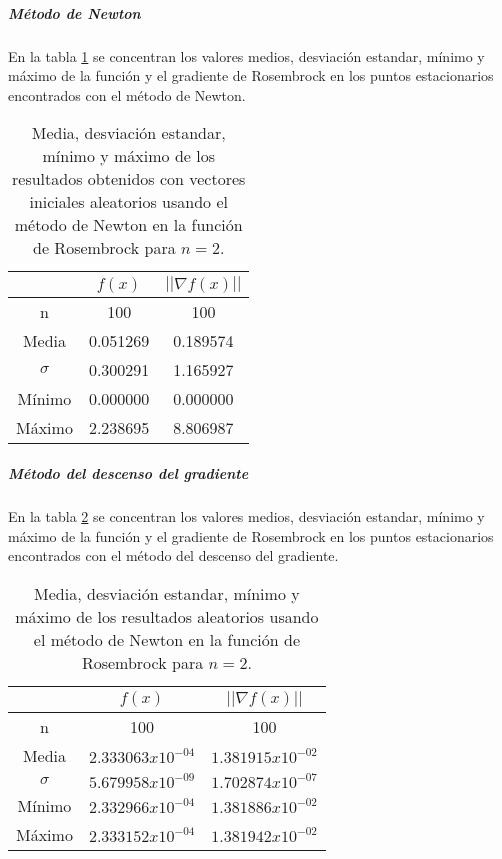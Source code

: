 \subparagraph{Método de Newton}

En la tabla \ref{table:rosembrock_2_random_newton} se concentran los valores medios, desviación estandar, mínimo y máximo de la función y el gradiente de Rosembrock en los puntos estacionarios encontrados con el método de Newton.

\begin{table}[H]
    \centering
    \begin{tabular}{ccc} \hline
                 & $f(x)$   & $||\nabla f(x)||$ \\ \hline
        n        & 100      & 100               \\
        Media    & 0.051269 & 0.189574          \\
        $\sigma$ & 0.300291 & 1.165927          \\
        Mínimo   & 0.000000 & 0.000000          \\
        Máximo   & 2.238695 & 8.806987          \\ \hline
    \end{tabular}
    \caption{Media, desviación estandar, mínimo y máximo de los resultados obtenidos con vectores iniciales aleatorios usando el método de Newton en la función de Rosembrock para $n=2$.}
    \label{table:rosembrock_2_random_newton}
\end{table}

\subparagraph{Método del descenso del gradiente}

En la tabla \ref{table:rosembrock_2_random_gradient} se concentran los valores medios, desviación estandar, mínimo y máximo de la función y el gradiente de Rosembrock en los puntos estacionarios encontrados con el método del descenso del gradiente.

\begin{table}[H]
    \centering
    \begin{tabular}{ccc} \hline
                 & $f(x)$              & $||\nabla f(x)||$   \\ \hline
        n        & 100                 & 100                 \\
        Media    & $2.333063x10^{-04}$ & $1.381915x10^{-02}$ \\
        $\sigma$ & $5.679958x10^{-09}$ & $1.702874x10^{-07}$ \\
        Mínimo   & $2.332966x10^{-04}$ & $1.381886x10^{-02}$ \\
        Máximo   & $2.333152x10^{-04}$ & $1.381942x10^{-02}$ \\ \hline
    \end{tabular}
    \caption{Media, desviación estandar, mínimo y máximo de los resultados aleatorios usando el método de Newton en la función de Rosembrock para $n=2$.}
    \label{table:rosembrock_2_random_gradient}
\end{table}

